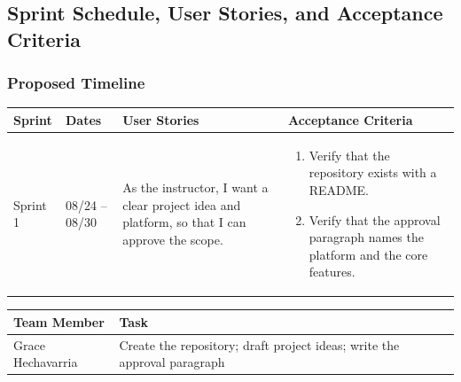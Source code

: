 \documentclass[12pt]{article}
\begin{document}
\subsection{Sprint Schedule, User Stories, and Acceptance Criteria}

\subsubsection{Proposed Timeline}

\noindent\begin{minipage}{\linewidth}

\vspace{0.5em}
\noindent
\begin{tabular}{|L{1.2cm}|L{1.8cm}|L{5.2cm}|L{6.3cm}|}
\hline
\textbf{Sprint} & \textbf{Dates} & \textbf{User Stories} & \textbf{Acceptance Criteria} \\
\hline
Sprint 1 & 08/24 -- 08/30 &
As the instructor, I want a clear project idea and platform, so that I can approve the scope. &
\begin{enumerate}
    \item Verify that the repository exists with a README.
    \item Verify that the approval paragraph names the platform and the core features.
\end{enumerate} \\
\hline
\end{tabular}

\vspace{0.5em}
\noindent
\begin{tabular}{|L{3.4cm}|L{11.6cm}|}
\hline
\textbf{Team Member} & \textbf{Task} \\
\hline
Grace Hechavarria & Create the repository; draft project ideas; write the approval paragraph \\
\hline
\end{tabular}
\end{minipage}

\vspace{1.5em}
\end{document}
